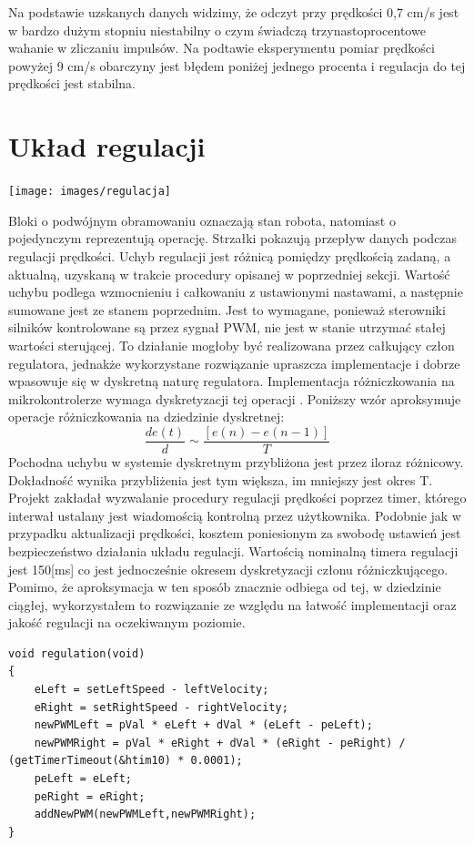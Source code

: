 \documentclass[eng,printmode]{mgr}
\begin{document}
Na podstawie uzskanych danych widzimy, że odczyt przy prędkości 0,7 cm/s jest w bardzo dużym stopniu niestabilny o czym świadczą trzynastoprocentowe wahanie w zliczaniu impulsów. Na podtawie eksperymentu pomiar prędkości powyżej 9 cm/s obarczyny jest błędem poniżej jednego procenta i regulacja do tej prędkości jest stabilna.
 \section{Układ regulacji}
   \begin{center}
    \texttt{[image: images/regulacja]}
   \end{center}

Bloki o podwójnym obramowaniu oznaczają stan robota, natomiast o pojedynczym reprezentują operację. Strzałki pokazują przepływ danych podczas regulacji prędkości. Uchyb regulacji jest różnicą pomiędzy prędkością zadaną, a aktualną, uzyskaną w trakcie procedury opisanej w poprzedniej sekcji. Wartość uchybu podlega wzmocnieniu i całkowaniu z ustawionymi nastawami, a następnie sumowane jest ze stanem poprzednim. Jest to wymagane,  ponieważ sterowniki silników kontrolowane są przez sygnał PWM, nie jest w stanie utrzymać stałej wartości sterującej. To działanie mogłoby być realizowana przez całkujący człon regulatora, jednakże wykorzystane rozwiązanie upraszcza implementacje i dobrze wpasowuje się w dyskretną naturę regulatora.
Implementacja różniczkowania na mikrokontrolerze wymaga dyskretyzacji tej operacji . Poniższy wzór aproksymuje operacje różniczkowania na dziedzinie dyskretnej:
\begin{equation}\label{eq:aproksymacja}
   \frac{de(t)}{d} \sim \frac{[e(n) - e(n-1)]}{T} 
  \end{equation}
Pochodna uchybu w systemie dyskretnym przybliżona jest przez iloraz różnicowy. Dokładność wynika przybliżenia jest tym większa, im mniejszy jest okres T. Projekt zakładał wyzwalanie procedury regulacji prędkości poprzez timer, którego interwał ustalany jest wiadomością kontrolną przez użytkownika. Podobnie jak w przypadku aktualizacji prędkości, kosztem poniesionym za swobodę ustawień jest bezpieczeństwo działania układu regulacji. Wartością nominalną timera regulacji jest 150[ms] co jest jednocześnie okresem dyskretyzacji członu różniczkującego. Pomimo, że aproksymacja w ten sposób znacznie odbiega od tej, w dziedzinie ciągłej, wykorzystałem to rozwiązanie ze względu na łatwość implementacji oraz jakość regulacji na oczekiwanym poziomie.
\begin{lstlisting}[style=c]
void regulation(void)
{
	eLeft = setLeftSpeed - leftVelocity;
	eRight = setRightSpeed - rightVelocity;
	newPWMLeft = pVal * eLeft + dVal * (eLeft - peLeft);
	newPWMRight = pVal * eRight + dVal * (eRight - peRight) / (getTimerTimeout(&htim10) * 0.0001);         
	peLeft = eLeft;
	peRight = eRight;
	addNewPWM(newPWMLeft,newPWMRight);
}
\end{lstlisting}
\end{document}
